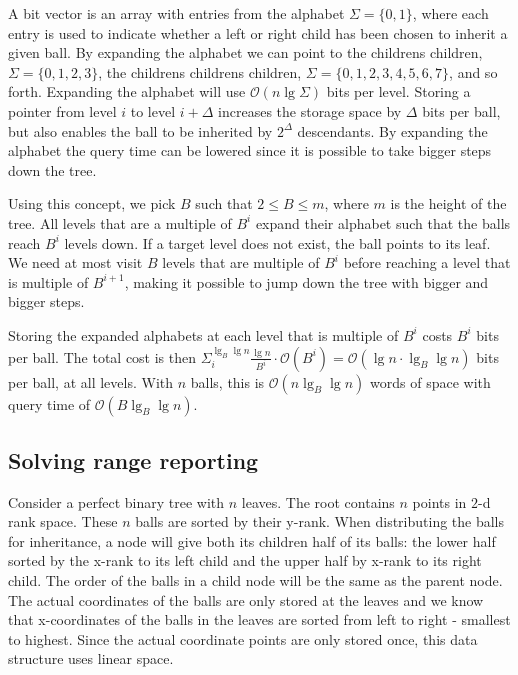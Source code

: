 A bit vector is an array with entries from the alphabet $\Sigma = \{0,1\}$, where each entry is used to indicate whether a left or right child has been chosen to inherit a given ball. By expanding the alphabet we can point to the childrens children, $\Sigma = \{0,1,2,3\}$, the childrens childrens children, $\Sigma = \{0,1,2,3,4,5,6,7\}$, and so forth. Expanding the alphabet will use $\mathcal{O}(n \lg \Sigma)$ bits per level. Storing a pointer from level $i$ to level $i+\Delta$ increases the storage space by $\Delta$ bits per ball, but also enables the ball to be inherited by $2^\Delta$ descendants. By expanding the alphabet the query time can be lowered since it is possible to take bigger steps down the tree. 

Using this concept, we pick $B$ such that $2 \leq B \leq m$, where $m$ is the height of the tree. All levels that are a multiple of $B^i$ expand their alphabet such that the balls reach $B^i$ levels down. If a target level does not exist, the ball points to its leaf. We need at most visit $B$ levels that are multiple of $B^i$ before reaching a level that is multiple of $B^{i+1}$, making it possible to jump down the tree with bigger and bigger steps.

Storing the expanded alphabets at each level that is multiple of $B^i$ costs $B^i$ bits per ball. The total cost is then $\Sigma^{\lg_B \lg n}_i \frac{\lg n}{B^i} \cdot \mathcal{O}(B^i) = \mathcal{O}(\lg n \cdot \lg_B \lg n)$ bits per ball, at all levels. With $n$ balls, this is $\mathcal{O}(n \lg_B \lg n)$ words of space with query time of $\mathcal{O}(B \lg_B \lg n)$. 



\subsection{Solving range reporting}

Consider a perfect binary tree with $n$ leaves. The root contains $n$ points in $2$-d rank space. These $n$ balls are sorted by their y-rank. When distributing the balls for inheritance, a node will give both its children half of its balls: the lower half sorted by the x-rank to its left child and the upper half by x-rank to its right child. The order of the balls in a child node will be the same as the parent node.  The actual coordinates of the balls are only stored at the leaves and we know that x-coordinates of the balls in the leaves are sorted from left to right - smallest to highest. Since the actual coordinate points are only stored once, this data structure uses linear space. \\


